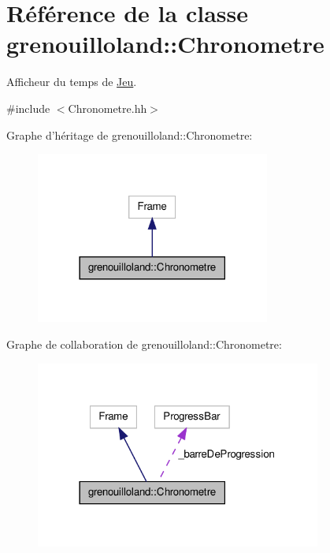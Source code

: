 \hypertarget{classgrenouilloland_1_1Chronometre}{\section{Référence de la classe grenouilloland\-:\-:Chronometre}
\label{classgrenouilloland_1_1Chronometre}
}


Afficheur du temps de \hyperlink{classgrenouilloland_1_1Jeu}{Jeu}.  




{\ttfamily \#include $<$Chronometre.\-hh$>$}



Graphe d'héritage de grenouilloland\-:\-:Chronometre\-:
\nopagebreak
\begin{figure}[H]
\begin{center}
\leavevmode
\includegraphics[width=218pt]{classgrenouilloland_1_1Chronometre__inherit__graph}
\end{center}
\end{figure}


Graphe de collaboration de grenouilloland\-:\-:Chronometre\-:
\nopagebreak
\begin{figure}[H]
\begin{center}
\leavevmode
\includegraphics[width=266pt]{classgrenouilloland_1_1Chronometre__coll__graph}
\end{center}
\end{figure}
